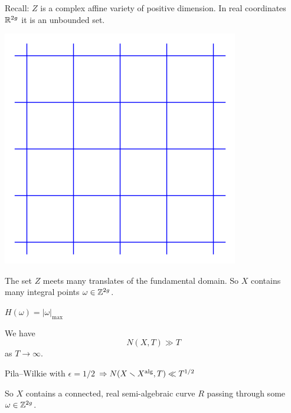 \documentclass{beamer}
\begin{document}
\begin{frame}
  Recall:
  $Z$ is a \alert{complex}  affine variety of positive
  dimension. In real coordinates ${\mathbb{R}}^{2g}$ it is an \alert{unbounded} set.
  \begin{minipage}{0.5\linewidth}
    \includegraphics[width=\textwidth]{grid.png}  
  \end{minipage}  \begin{minipage}{0.45\linewidth}
    The set $Z$ meets many translates of the fundamental domain.
    So $X$ contains many integral points $\omega\in{\mathbb{Z}}^{2g}$. 

    $H(\omega) = |\omega|_{\mathrm{max}}$
    
    We have $$N(X,T)\gg T$$ as $T\rightarrow\infty$. 
  \end{minipage}
  
  Pila--Wilkie with $\epsilon=1/2$ $\Rightarrow N(X\smallsetminus
  X^{\mathrm{alg}},T)\ll T^{1/2}$

  So $X$ contains a connected, real semi-algebraic curve $R$ passing
  through some $\omega\in{\mathbb{Z}}^{2g}$. 
\end{frame}
\end{document}
